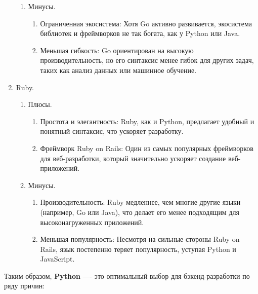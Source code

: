 \begin{enumerate}
\begin{enumerate}
		\item Минусы.
		\begin{enumerate}
			\item Ограниченная экосистема: Хотя Go активно развивается, экосистема библиотек и фреймворков не так богата, как у Python или Java.
			\item Меньшая гибкость: Go ориентирован на высокую производительность, но его синтаксис менее гибок для других задач, таких как анализ данных или машинное обучение.
		\end{enumerate}
	\end{enumerate}

	\item Ruby.
	\begin{enumerate}
		\item Плюсы.
		\begin{enumerate}
			\item Простота и элегантность: Ruby, как и Python, предлагает удобный и понятный синтаксис, что ускоряет разработку.
			\item Фреймворк Ruby on Rails: Один из самых популярных фреймворков для веб-разработки, который значительно ускоряет создание веб-приложений.
		\end{enumerate}

		\item Минусы.
		\begin{enumerate}
			\item Производительность: Ruby медленнее, чем многие другие языки (например, Go или Java), что делает его менее подходящим для высоконагруженных приложений.
			\item Меньшая популярность: Несмотря на сильные стороны Ruby on Rails, язык постепенно теряет популярность, уступая Python и JavaScript.
		\end{enumerate}
	\end{enumerate}
\end{enumerate}


Таким образом, \textbf{Python} \cite{python} —- это оптимальный выбор для бэкенд-разработки по ряду причин:

